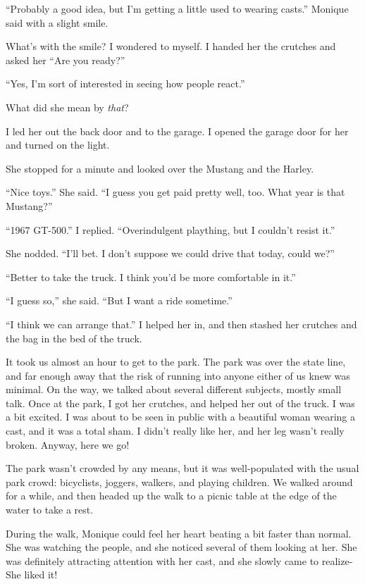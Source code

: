``Probably a good idea, but I'm getting a little used to wearing casts.'' Monique said with
a slight smile.

What's with the smile? I wondered to myself. I handed her the crutches and asked her ``Are
you ready?''

``Yes, I'm sort of interested in seeing how people react.''

What did she mean by \emph{that}?

I led her out the back door and to the garage. I opened the garage door for her and turned
on the light.

She stopped for a minute and looked over the Mustang and the Harley.

``Nice toys.'' She said. ``I guess you get paid pretty well, too. What year is that
Mustang?''

``1967 GT-500.'' I replied. ``Overindulgent plaything, but I couldn't resist it.''

She nodded. ``I'll bet. I don't suppose we could drive that today, could we?''

``Better to take the truck. I think you'd be more comfortable in it.''

``I guess so,'' she said. ``But I want a ride sometime.''

``I think we can arrange that.'' I helped her in, and then stashed her crutches and the bag
in the bed of the truck.

It took us almost an hour to get to the park. The park was over the state line, and far
enough away that the risk of running into anyone either of us knew was minimal. On the way, we
talked about several different subjects, mostly small talk. Once at the park, I got her
crutches, and helped her out of the truck. I was a bit excited. I was about to be seen in public
with a beautiful woman wearing a cast, and it was a total sham. I didn't really like her, and
her leg wasn't really broken. Anyway, here we go!

The park wasn't crowded by any means, but it was well-populated with the usual park crowd:
bicyclists, joggers, walkers, and playing children. We walked around for a while, and then
headed up the walk to a picnic table at the edge of the water to take a rest.

During the walk, Monique could feel her heart beating a bit faster than normal. She was
watching the people, and she noticed several of them looking at her. She was definitely
attracting attention with her cast, and she slowly came to realize- She liked it!

